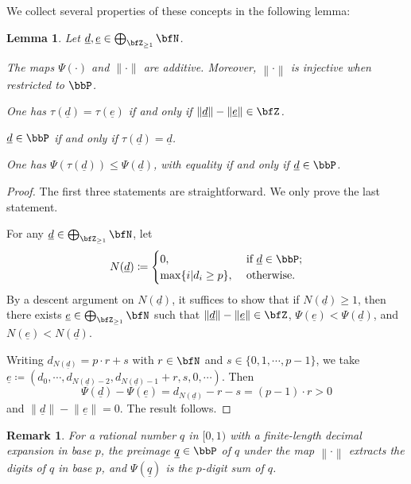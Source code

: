 \documentclass[english,oneside]{smfart}
\newcommand{\uld}{\underline{d}}
\newcommand{\normd}{\lVert\uld\rVert}
\newcommand{\norm}[1]{\left\lVert#1\right\rVert}
\newtheorem{lemma}[theorem]{Lemma}
\newtheorem{remark}[theorem]{Remark}
\begin{document}
We collect several properties of these concepts in the following lemma:
\begin{lemma}\label{lem:18813}
    Let $\uld,\underline{e}\in\bigoplus_{\bfZ_{\geq 1}}\bfN$.
    \begin{lemenum}
        \item\label{it:28363} The maps $\Psi(\cdot)$ and $\lVert \cdot\rVert$ are additive. Moreover, $\norm{\cdot}$ is injective when restricted to $\bbP$.
        \item\label{it:52935} One has $\tau(\uld)=\tau(\underline{e})$ if and only if $\normd-\lVert \underline{e}\rVert\in\bfZ$.
        \item $\uld\in\bbP$ if and only if $\tau(\uld)=\uld$.
        \item\label{lem:17816} One has $\Psi(\tau(\uld))\leq \Psi(\uld)$, with equality if and only if $\uld\in\bbP$.
    \end{lemenum}
\end{lemma}
\begin{proof}
    The first three statements are straightforward. We only prove the last statement.

    For any $\uld\in\bigoplus_{\bfZ_{\geq 1}}\bfN$, let
    $$N(\uld)\coloneqq\begin{cases}
            0,                   & \text{ if }\uld\in\bbP; \\
            \max\{i|d_i\geq p\}, & \text{ otherwise}.
        \end{cases}$$
    By a descent argument on $N(\uld)$, it suffices to show that if $N(\underline{d})\geq 1$, then there exists $\underline{e}\in\bigoplus_{\bfZ_{\geq 1}}\bfN$ such that $\normd-\lVert \underline{e}\rVert\in\bfZ$, $\Psi(\underline{e})<\Psi(\uld)$, and $N(\underline{e})<N(\underline{d})$.

    Writing $d_{N(\uld)}=p\cdot r + s$ with $r\in\bfN$ and $s\in\{0,1,\cdots,p-1\}$, we take $\underline{e}\coloneqq (d_0,\cdots,d_{N(\uld)-2},d_{N(\uld)-1}+r,s,0,\cdots)$. Then
    $$\Psi(\uld)-\Psi(\underline{e})=d_{N(\uld)}-r-s= (p-1)\cdot r>0$$
    and $\normd-\lVert \underline{e}\rVert=0$. The result follows.
\end{proof}
\begin{remark}
    For a rational number $q$ in $[0,1)$ with a finite-length decimal expansion in base $p$, the preimage $\underline{q}\in\bbP$ of $q$ under the map $\norm{\cdot}$ extracts the digits of $q$ in base $p$, and $\Psi(\underline{q})$ is the $p$-digit sum of $q$.
\end{remark}
\end{document}
